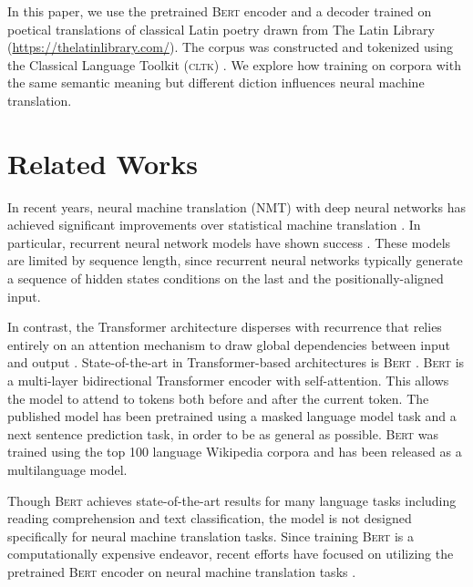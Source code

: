 \documentclass[11pt,a4paper]{article}
\begin{document}
In this paper, we use the pretrained \textsc{Bert} encoder \cite{devlin2018Bert}
and a decoder trained on poetical translations of classical Latin poetry
drawn from The Latin Library (\href{https://thelatinlibrary.com/}{https://thelatinlibrary.com/}).
The corpus was constructed and tokenized using the Classical Language Toolkit (\textsc{cltk}) \cite{johnson2014}.
We explore how training on corpora with the same semantic meaning but different diction influences neural machine translation.

\section{Related Works}

In recent years, neural machine translation (NMT) with deep neural networks has achieved significant improvements over statistical machine translation \citep{DBLP:journals/corr/SutskeverVL14, bahdanau2014neural, cho2014learning}.
In particular, recurrent neural network models have shown success \citep{jozefowicz2016exploring,kuchaiev2017factorization}. 
These models are limited by sequence length, since recurrent neural networks typically generate a sequence of hidden states conditions on the last and the positionally-aligned input.

In contrast, the Transformer architecture disperses with recurrence that relies entirely on an attention mechanism to draw global dependencies between input and output \citep{bahdanau2014neural, vaswani2017attention}.
State-of-the-art in Transformer-based architectures is \textsc{Bert} \citep{devlin2018Bert}.
\textsc{Bert} is a multi-layer bidirectional Transformer encoder with self-attention.
This allows the model to attend to tokens both before and after the current token.
The published model has been pretrained using a masked language model task and a next sentence prediction task, in order to be as general as possible.
\textsc{Bert} was trained using the top 100 language Wikipedia corpora and has been released as a multilanguage model.

Though \textsc{Bert} achieves state-of-the-art results for many language tasks
including reading comprehension and text classification,
the model is not designed specifically for neural machine translation tasks.
Since training \textsc{Bert} is a computationally expensive endeavor,
recent efforts have focused on utilizing the pretrained \textsc{Bert} encoder
on neural machine translation tasks \citep{liu2019text, yang2019making, imamura-sumita-2019-recycling, clinchant2019use}.
\end{document}
